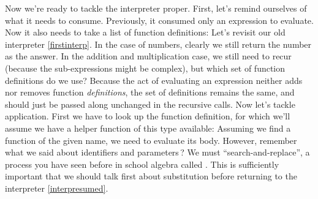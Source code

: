 
Now we’re ready to tackle the interpreter proper. First, let’s remind ourselves
of what it needs to consume. Previously, it consumed only an expression to
evaluate. Now it also needs to take a list of function definitions:
Let’s revisit our old interpreter \ref{firstinterp}. In the case of numbers,
clearly we still return the number as the answer. In the addition and
multiplication case, we still need to recur (because the sub-expressions might
be complex), but which set of function definitions do we use? Because the act of
evaluating an expression neither adds nor removes function \emph{definitions},
the set of definitions remains the same, and should just be passed along
unchanged in the recursive calls.
Now let’s tackle application. First we have to look up the function definition,
for which we’ll assume we have a helper function of this type available:
Assuming we find a function of the given name, we need to evaluate its body.
However, remember what we said about identifiers and parameters\,? We must
“search-and-replace”, a process you have seen before in school algebra called
. This is sufficiently important that we
should talk first about substitution before returning to the interpreter
\ref{interpresumed}.
